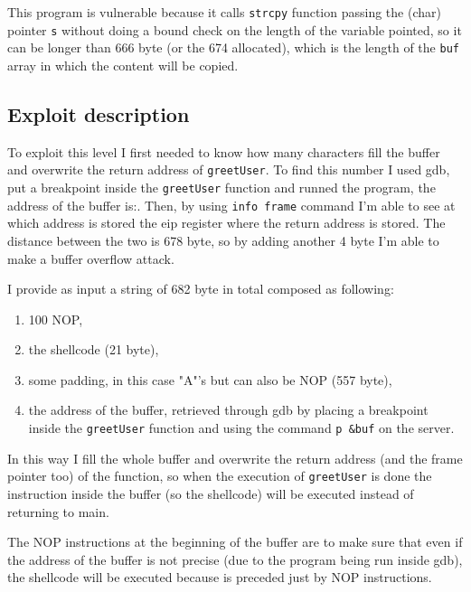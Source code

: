 \documentclass[a4paper,12pt]{article}
\begin{document}
This program is vulnerable because it calls \texttt{strcpy} function passing the (char) pointer \texttt{s} without doing a bound check on the length of the variable pointed, so it can be longer than 666 byte (or the 674 allocated), which is the length of the \texttt{buf} array in which the content will be copied.

\subsection{Exploit description}

To exploit this level I first needed to know how many characters fill the buffer and overwrite the return address of \texttt{greetUser}. To find this number I used gdb, put a breakpoint inside the \texttt{greetUser} function and runned the program, the address of the buffer is:. Then, by using \texttt{info frame} command I'm able to see at which address is stored the eip register where the return address is stored. The distance between the two is 678 byte, so by adding another 4 byte I'm able to make a buffer overflow attack.

I provide as input a string of 682 byte in total composed as following:
\begin{enumerate}
\item 100 NOP,
\item the shellcode (21 byte),
\item some padding, in this case "A"'s but can also be NOP (557 byte),
\item the address of the buffer, retrieved through gdb by placing a breakpoint inside the \texttt{greetUser} function and using the command \texttt{p \&buf} on the server.
\end{enumerate}


In this way I fill the whole buffer and overwrite the return address (and the frame pointer too) of the function, so when the execution of \texttt{greetUser} is done the instruction inside the buffer (so the shellcode) will be executed instead of returning to main. 

The NOP instructions at the beginning of the buffer are to make sure that even if the address of the buffer is not precise (due to the program being run inside gdb), the shellcode will be executed because is preceded just by NOP instructions.
\end{document}
